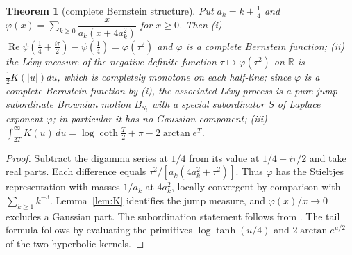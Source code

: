 \documentclass[10pt]{amsart}
\newtheorem{theorem}{Theorem}[section]
\theoremstyle{definition}
\theoremstyle{remark}
\newcommand{\R}{\mathbb R}
\newcommand{\Rel}{\operatorname{Re}}
\begin{document}
\begin{theorem}[complete Bernstein structure]\label{thm:S}
Put $a_k=k+\frac14$ and $\varphi(x)=\sum_{k\ge0}\dfrac{x}{a_k(x+4a_k^2)}$ for $x\ge0$. Then
\emph{(i)} $\Rel\psi(\frac14+\frac{i\tau}2)-\psi(\frac14)=\varphi(\tau^2)$ and $\varphi$ is a
complete Bernstein function; \emph{(ii)} the L\'evy measure of the negative-definite function
$\tau\mapsto\varphi(\tau^2)$ on $\R$ is $\frac12K(|u|)du$, which is completely monotone on each
half-line; since $\varphi$ is a complete Bernstein function by (i), the associated L\'evy process is a pure-jump subordinate Brownian motion
$B_{S_t}$ with a special subordinator $S$ of Laplace exponent $\varphi$; in particular it has no
Gaussian component; \emph{(iii)} $\int_{2T}^\infty K(u)\,du=\log\coth\frac T2+\pi-2\arctan e^{T}$.
\end{theorem}
\begin{proof}
Subtract the digamma series at $1/4$ from its value at
$1/4+i\tau/2$ and take real parts. Each difference equals
$\tau^2/[a_k(4a_k^2+\tau^2)]$. Thus $\varphi$ has the Stieltjes
representation with masses $1/a_k$ at $4a_k^2$, locally convergent
by comparison with $\sum_{k\ge1}k^{-3}$. Lemma~\ref{lem:K} identifies
the jump measure, and $\varphi(x)/x\to0$ excludes a Gaussian part.
The subordination statement follows from \cite[Chs.~6,13]{SSV2012}.
The tail formula follows by evaluating the primitives
$\log\tanh(u/4)$ and $2\arctan e^{u/2}$ of the two hyperbolic kernels.
\end{proof}
\end{document}
